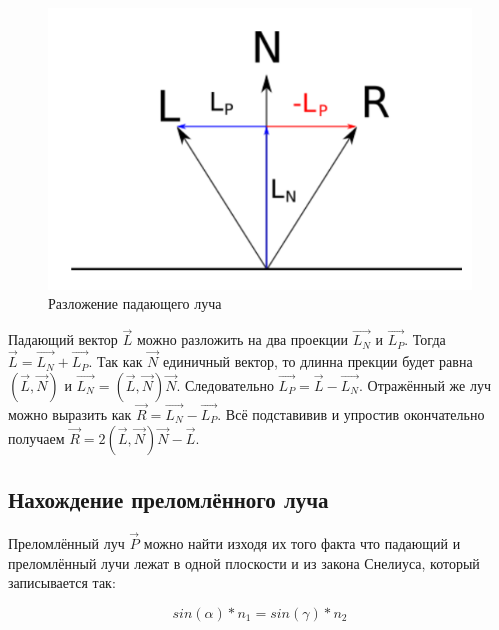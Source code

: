 \documentclass[12pt,a4paper,oneside]{report}
\begin{document}
				\begin{figure}[htp]
					\centering
					\includegraphics[scale=0.5]{reflect}
					\caption{Разложение падающего луча}
					\label{fig:reflect}
				\end{figure}
				
				Падающий вектор $\vec{L}$ можно разложить на два проекции $\vec{L_{N}}$ и $\vec{L_{P}}$. Тогда $\vec{L} = \vec{L_{N}} + \vec{L_{P}}$. Так как $\vec{N}$ единичный вектор, то длинна прекции будет равна $(\vec{L}, \vec{N})$ и $\vec{L_{N}} = (\vec{L}, \vec{N})\vec{N}$. Следовательно $\vec{L_{P}} = \vec{L} - \vec{L_{N}}$. Отражённый же луч можно выразить как $\vec{R} = \vec{L_{N}} - \vec{L_{P}}$. Всё подставивив и упростив окончательно получаем $\vec{R} = 2(\vec{L}, \vec{N})\vec{N} - \vec{L}$.
			\subsection{Нахождение преломлённого луча}
				\quad Преломлённый луч $\vec{P}$ можно найти изходя их того факта что падающий и преломлённый лучи лежат в одной плоскости и из закона Снелиуса, который записывается так:
				
				\[
    				sin(\alpha)*n_{1} = sin(\gamma)*n_{2}
					\label{eq:9}
				\] 
				
\end{document}
